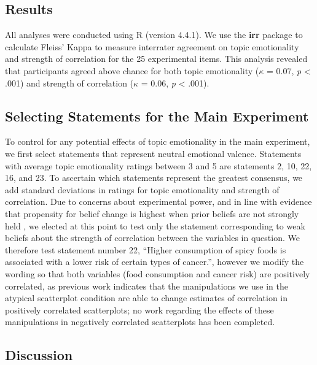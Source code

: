 \documentclass[manuscript,screen,review]{acmart}
\begin{document}
\subsection{Results}\label{sec-results-pre}

All analyses were conducted using R (version 4.4.1). We use the
\textbf{irr} package to calculate Fleiss' Kappa to measure interrater
agreement on topic emotionality and strength of correlation for the 25
experimental items. This analysis revealed that participants agreed
above chance for both topic emotionality (\(\kappa\) = 0.07, \emph{p}
\textless{} .001) and strength of correlation (\(\kappa\) = 0.06,
\emph{p} \textless{} .001).

\subsection{Selecting Statements for the Main
Experiment}\label{selecting-statements-for-the-main-experiment}

To control for any potential effects of topic emotionality in the main
experiment, we first select statements that represent neutral emotional
valence. Statements with average topic emotionality ratings between 3
and 5 are statements 2, 10, 22, 16, and 23. To ascertain which
statements represent the greatest consensus, we add standard deviations
in ratings for topic emotionality and strength of correlation. Due to
concerns about experimental power, and in line with evidence that
propensity for belief change is highest when prior beliefs are not
strongly held \citep{xiong_2022}, we elected at this point to test only
the statement corresponding to weak beliefs about the strength of
correlation between the variables in question. We therefore test
statement number 22, ``Higher consumption of spicy foods is associated
with a lower risk of certain types of cancer.'', however we modify the
wording so that both variables (food consumption and cancer risk) are
positively correlated, as previous work indicates that the manipulations
we use in the atypical scatterplot condition are able to change
estimates of correlation in positively correlated scatterplots; no work
regarding the effects of these manipulations in negatively correlated
scatterplots has been completed.

\subsection{Discussion}\label{sec-discussion-pre}
\end{document}
